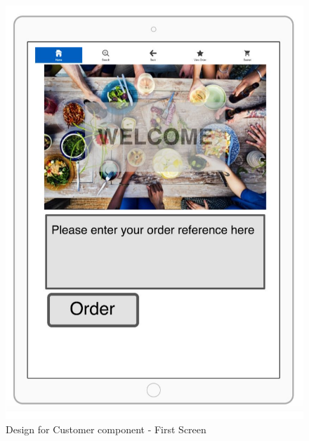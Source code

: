 \documentclass[11pt, a4paper]{report}
\begin{document}
\begin{figure}
\centering
\includegraphics[scale=0.5]{Figures/Customer1.png}
\caption{Design for Customer component - First Screen}
\end{figure}
\end{document}

